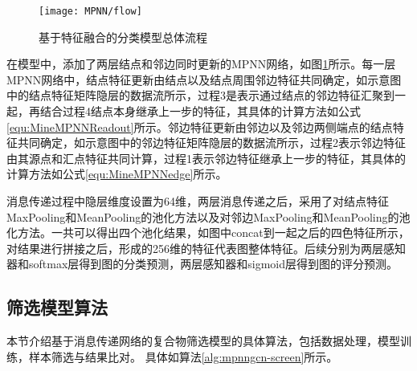\begin{figure}[htbp]
    \centering
    \texttt{[image: MPNN/flow]}
    \caption{基于特征融合的分类模型总体流程}
    \label{fig:MPNN/flow}
\end{figure}

在模型中，添加了两层结点和邻边同时更新的MPNN网络，如图\ref{fig:MPNN/flow}所示。每一层MPNN网络中，结点特征更新由结点以及结点周围邻边特征共同确定，如示意图中的结点特征矩阵隐层的数据流所示，过程3是表示通过结点的邻边特征汇聚到一起，再结合过程4结点本身继承上一步的特征，其具体的计算方法如公式\ref{equ:MineMPNNReadout}所示。邻边特征更新由邻边以及邻边两侧端点的结点特征共同确定，如示意图中的邻边特征矩阵隐层的数据流所示，过程2表示邻边特征由其源点和汇点特征共同计算，过程1表示邻边特征继承上一步的特征，其具体的计算方法如公式\ref{equ:MineMPNNedge}所示。

消息传递过程中隐层维度设置为64维，两层消息传递之后，采用了对结点特征MaxPooling和MeanPooling的池化方法以及对邻边MaxPooling和MeanPooling的池化方法。一共可以得出四个池化结果，如图中concat到一起之后的四色特征所示，对结果进行拼接之后，形成的256维的特征代表图整体特征。后续分别为两层感知器和softmax层得到图的分类预测，两层感知器和sigmoid层得到图的评分预测。

\subsection{筛选模型算法}
本节介绍基于消息传递网络的复合物筛选模型的具体算法，包括数据处理，模型训练，样本筛选与结果比对。
具体如算法\ref{alg:mpnngcn-screen}所示。

